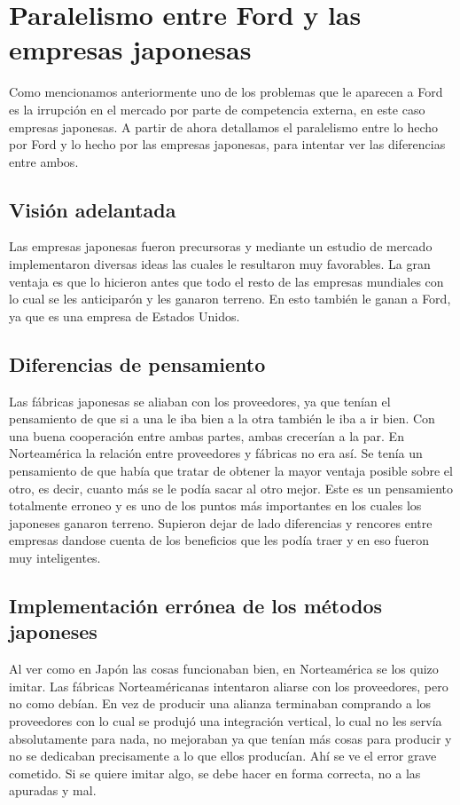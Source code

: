 \section{Paralelismo entre Ford y las empresas japonesas}
Como mencionamos anteriormente uno de los problemas que le aparecen a Ford es la irrupci\'on en el mercado por parte de competencia externa, en este caso empresas japonesas. A partir de ahora detallamos el paralelismo entre lo hecho por Ford y lo hecho por las empresas japonesas, para intentar ver las diferencias entre ambos.
	\subsection{Visi\'on adelantada}
	Las empresas japonesas fueron precursoras y mediante un estudio de mercado implementaron diversas ideas las cuales le resultaron muy favorables. La gran ventaja es que lo hicieron antes que todo el resto de las empresas mundiales con lo cual se les anticipar\'on y les ganaron terreno. En esto tambi\'en le ganan a Ford, ya que es una empresa de Estados Unidos. 
	\subsection{Diferencias de pensamiento}
	Las f\'abricas japonesas se aliaban con los proveedores, ya que tenían el pensamiento de que si a una le iba bien a la otra tambi\'en le iba a ir bien. Con una buena cooperaci\'on entre ambas partes, ambas crecerían a la par. En Norteam\'erica la relaci\'on entre proveedores y f\'abricas no era así. Se tenía un pensamiento de que había que tratar de obtener la mayor ventaja posible sobre el otro, es decir, cuanto m\'as se le podía sacar al otro mejor. Este es un pensamiento totalmente erroneo y es uno de los puntos m\'as importantes en los cuales los japoneses ganaron terreno. Supieron dejar de lado diferencias y rencores entre empresas dandose cuenta de los beneficios que les podía traer y en eso fueron muy inteligentes.
	\subsection{Implementaci\'on err\'onea de los m\'etodos japoneses}
	Al ver como en Jap\'on las cosas funcionaban bien, en Norteam\'erica se los quizo imitar. Las f\'abricas Norteam\'ericanas intentaron aliarse con los proveedores, pero no como debían. En vez de producir una alianza terminaban comprando a los proveedores con lo cual se produj\'o una integraci\'on vertical, lo cual no les servía absolutamente para nada, no mejoraban ya que tenían m\'as cosas para producir y no se dedicaban precisamente a lo que ellos producían. Ahí se ve el error grave cometido. Si se quiere imitar algo, se debe hacer en forma correcta, no a las apuradas y mal.
